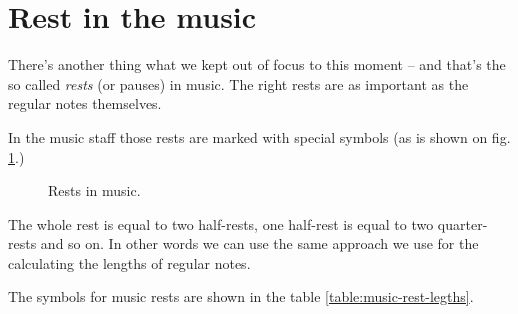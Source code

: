 \documentclass[../sparc.tex]{subfiles}
\begin{document}
\section{Rest in the music}

There's another thing what we kept out of focus to this moment -- and that's the
so called \emph{rests} (or pauses) in music.  The right rests are as important
as the regular notes themselves.

In the music staff those rests are marked with special symbols (as is shown on
fig. \ref{fig:lilypond-rest-example-1}.)

\begin{figure}[ht]
  \centering
  \caption{Rests in music.}
  \label{fig:lilypond-rest-example-1}
\end{figure}

The whole rest is equal to two half-rests, one half-rest is equal to two
quarter-rests and so on.  In other words we can use the same approach we use for
the calculating the lengths of regular notes.

The symbols for music rests are shown in the table
\ref{table:music-rest-legths}.
\end{document}

